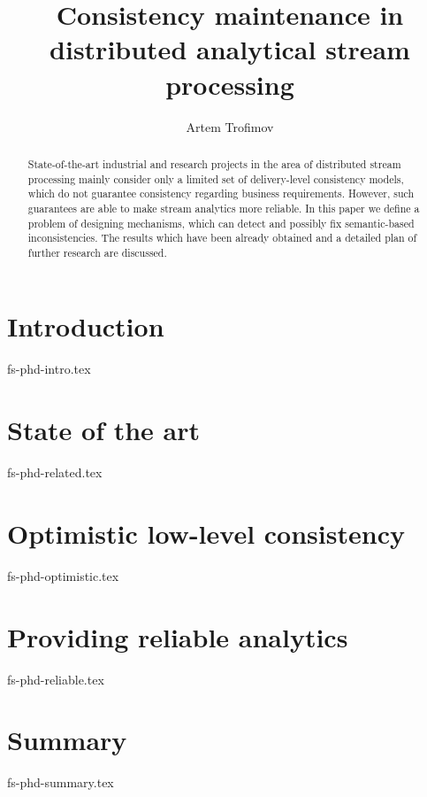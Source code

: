 \documentclass[runningheads]{llncs}
\begin{document}
\title {Consistency maintenance in distributed analytical stream processing}
\author{Artem Trofimov}

\maketitle

\begin{abstract}
State-of-the-art industrial and research projects in the area of distributed stream processing mainly consider only a limited set of delivery-level consistency models, which do not guarantee consistency regarding business requirements. However, such guarantees are able to make stream analytics more reliable. In this paper we define a problem of designing mechanisms, which can detect and possibly fix semantic-based inconsistencies. The results which have been already obtained and a detailed plan of further research are discussed.
\end{abstract}

\section {Introduction}
 {fs-phd-intro.tex}

\section {State of the art}
 {fs-phd-related.tex}

\section {Optimistic low-level consistency}
 {fs-phd-optimistic.tex}

\section{Providing reliable analytics}
 {fs-phd-reliable.tex}

\section {Summary}
 {fs-phd-summary.tex}



\end{document}
